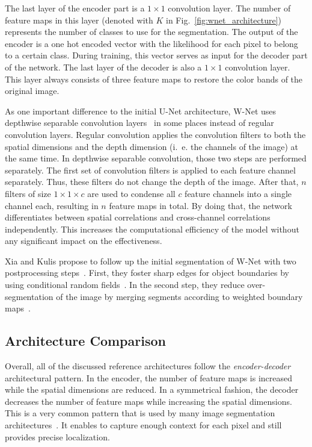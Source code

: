 The last layer of the encoder part is a $1\times 1$ convolution layer. The number of feature maps in this layer (denoted with $K$ in Fig.~\ref{fig:wnet_architecture}) represents the number of classes to use for the segmentation. The output of the encoder is a one hot encoded vector with the likelihood for each pixel to belong to a certain class. During training, this vector serves as input for the decoder part of the network. The last layer of the decoder is also a $1\times 1$ convolution layer. This layer always consists of three feature maps to restore the color bands of the original image.

As one important difference to the initial U-Net architecture, W-Net uses depthwise separable convolution layers~\cite{depthwise_conv17} in some places instead of regular convolution layers. Regular convolution applies the convolution filters to both the spatial dimensions and the depth dimension (i.~e. the channels of the image) at the same time. In depthwise separable convolution, those two steps are performed separately. The first set of convolution filters is applied to each feature channel separately. Thus, these filters do not change the depth of the image. After that, $n$ filters of size $1\times 1\times c$ are used to condense all $c$ feature channels into a single channel each, resulting in $n$ feature maps in total. By doing that, the network differentiates between spatial correlations and cross-channel correlations independently. This increases the computational efficiency of the model without any significant impact on the effectiveness.

Xia and Kulis propose to follow up the initial segmentation of W-Net with two postprocessing steps~\cite{wnet17}. First, they foster sharp edges for object boundaries by using conditional random fields~\cite{crf17}. In the second step, they reduce over-segmentation of the image by merging segments according to weighted boundary maps~\cite{hierarchy_imgseg11}.

\subsection{Architecture Comparison}
Overall, all of the discussed reference architectures follow the \emph{encoder-decoder} architectural pattern. In the encoder, the number of feature maps is increased while the spatial dimensions are reduced. In a symmetrical fashion, the decoder decreases the number of feature maps while increasing the spatial dimensions. This is a very common pattern that is used by many image segmentation architectures~\cite{imseg_survey20}. It enables to capture enough context for each pixel and still provides precise localization.

